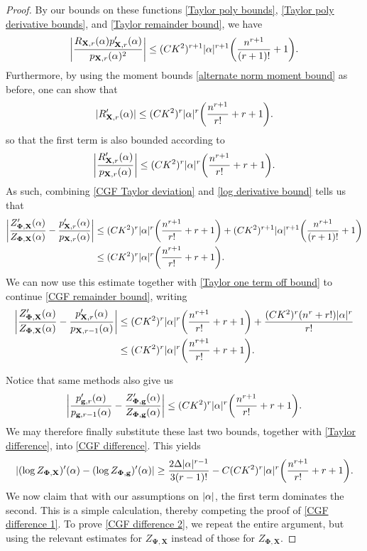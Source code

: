 \documentclass[final,12pt]{colt2018} %
\numberwithin{equation}{section}
\DeclarePairedDelimiter{\abs}{\lvert}{\rvert}
\DeclarePairedDelimiter{\paren}{(}{)}
\newcommand{\boldg}{\textbf{g}}
\newcommand{\boldPhi}{\boldsymbol{\Phi}}
\newcommand{\boldPsi}{\boldsymbol{\Psi}}
\newcommand{\boldX}{\textbf{X}}
\begin{document}
\begin{proof}
	By our bounds on these functions \eqref{Taylor poly bounds}, \eqref{Taylor poly derivative bounds}, and \eqref{Taylor remainder bound}, we have
	\begin{align}
	\abs*{\frac{R_{\boldX,r}(\alpha)p_{\boldX,r}'(\alpha)}{p_{\boldX,r}(\alpha)^2}} \leq (CK^2)^{r+1}\abs{\alpha}^{r+1}\paren*{\frac{n^{r+1}}{(r+1)!}+1}.
	\end{align}
	Furthermore, by using the moment bounds \eqref{alternate norm moment bound} as before, one can show that
	\[
	\abs{R_{\boldX,r}'(\alpha)} \leq (CK^2)^r\abs{\alpha}^r\paren*{\frac{n^{r+1}}{r!}+r+1}.
	\]
	so that the first term is also bounded according to
	\begin{align}
	\abs*{\frac{R_{\boldX,r}'(\alpha)}{p_{\boldX,r}(\alpha)}} \leq (CK^2)^r\abs{\alpha}^r\paren*{\frac{n^{r+1}}{r!}+r+1}.
	\end{align}
	As such, combining \eqref{CGF Taylor deviation} and \eqref{log derivative bound} tells us that 
	\begin{align}
	\abs*{\frac{Z_{\boldPhi,\boldX}'(\alpha)}{Z_{\boldPhi,\boldX}(\alpha)} - \frac{p_{\boldX,r}'(\alpha)}{p_{\boldX,r}(\alpha)}} & \leq (CK^2)^r\abs{\alpha}^r\paren*{\frac{n^{r+1}}{r!}+r+1} + (CK^2)^{r+1}\abs{\alpha}^{r+1}\paren*{\frac{n^{r+1}}{(r+1)!}+1} \nonumber \\
	& \leq (CK^2)^r\abs{\alpha}^r\paren*{\frac{n^{r+1}}{r!}+r+1}.
	\end{align}
	We can now use this estimate together with \eqref{Taylor one term off bound} to continue \eqref{CGF remainder bound}, writing
	\begin{align}
	\abs*{\frac{Z_{\boldPhi,\boldX}'(\alpha)}{Z_{\boldPhi,\boldX}(\alpha)} - \frac{p_{\boldX,r}'(\alpha)}{p_{\boldX,r-1}(\alpha)}} & \leq (CK^2)^r\abs{\alpha}^r\paren*{\frac{n^{r+1}}{r!}+r+1} +  \frac{(CK^2)^r(n^r+r!)\abs{\alpha}^r}{r!} \nonumber \\
	& \leq (CK^2)^r\abs{\alpha}^r\paren*{\frac{n^{r+1}}{r!}+r+1}.
	\end{align}
	
	Notice that same methods also give us
	\begin{align}
	\abs*{\frac{p_{\boldg,r}'(\alpha)}{p_{\boldg,r-1}(\alpha)} - \frac{Z_{\boldPhi,\boldg}'(\alpha)}{Z_{\boldPhi,\boldg}(\alpha)}} \leq (CK^2)^r\abs{\alpha}^r\paren*{\frac{n^{r+1}}{r!}+r+1}.
	\end{align}
	We may therefore finally substitute these last two bounds, together with \eqref{Taylor difference}, into \eqref{CGF difference}. This yields
	\begin{align}
	\abs*{(\log Z_{\boldPhi,\boldX})'(\alpha)-(\log Z_{\boldPhi,\boldg})'(\alpha)} \geq \frac{2\Delta\abs{\alpha}^{r-1}}{3(r-1)!} - C(CK^2)^r\abs{\alpha}^r\paren*{\frac{n^{r+1}}{r!}+r+1}.
	\end{align}
	We now claim that with our assumptions on $\abs{\alpha}$, the first term dominates the second. This is a simple calculation, thereby competing the proof of \eqref{CGF difference 1}. To prove \eqref{CGF difference 2}, we repeat the entire argument, but using the relevant estimates for $Z_{\boldPsi,\boldX}$ instead of those for $Z_{\boldPhi,\boldX}$.
\end{proof}
\end{document}
